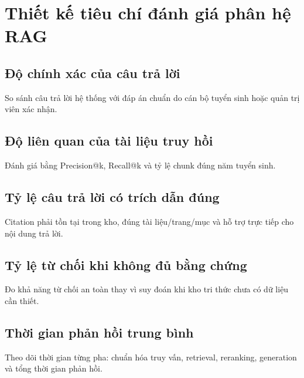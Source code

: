 ﻿\section{Thiết kế tiêu chí đánh giá phân hệ RAG}

\subsection{Độ chính xác của câu trả lời}

So sánh câu trả lời hệ thống với đáp án chuẩn do cán bộ tuyển sinh hoặc quản trị viên xác nhận.

\subsection{Độ liên quan của tài liệu truy hồi}

Đánh giá bằng Precision@k, Recall@k và tỷ lệ chunk đúng năm tuyển sinh.

\subsection{Tỷ lệ câu trả lời có trích dẫn đúng}

Citation phải tồn tại trong kho, đúng tài liệu/trang/mục và hỗ trợ trực tiếp cho nội dung trả lời.

\subsection{Tỷ lệ từ chối khi không đủ bằng chứng}

Đo khả năng từ chối an toàn thay vì suy đoán khi kho tri thức chưa có dữ liệu cần thiết.

\subsection{Thời gian phản hồi trung bình}

Theo dõi thời gian từng pha: chuẩn hóa truy vấn, retrieval, reranking, generation và tổng thời gian phản hồi.
